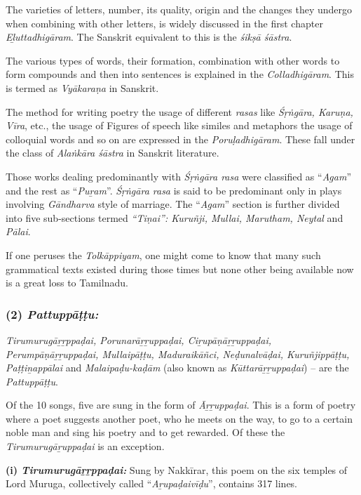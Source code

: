 The varieties of letters, number, its quality, origin and the changes they undergo when combining with other letters, is widely discussed in the first chapter \textit{Eḻuttadhigāram}. The Sanskrit equivalent to this is the \textit{śikṣā śāstra}.

The various types of words, their formation, combination with other words to form compounds and then into sentences is explained in the \textit{Colladhigāram}. This is termed as \textit{Vyākaraṇa} in Sanskrit.

The method for writing poetry the usage of different \textit{rasas} like \textit{Śṛṅgāra, Karuṇa, Vīra}, etc., the usage of Figures of speech like similes and metaphors the usage of colloquial words and so on are expressed in the \textit{Poruḷadhigāram}. These fall under the class of \textit{Alaṅkāra śāstra} in Sanskrit literature.

Those works dealing predominantly with \textit{Śṛṅgāra rasa} were classified as “\textit{Agam}” and the rest as “\textit{Puṟam}”. \textit{Śṛṅgāra rasa} is said to be predominant only in plays involving \textit{Gāndharva} style of marriage. The “\textit{Agam}” section is further divided into five sub-sections termed \textit{“Tiṇai”: Kuruñji, Mullai, Marutham, Neytal} and \textit{ Pālai}.

If one peruses the \textit{Tolkāppiyam}, one might come to know that many such grammatical texts existed during those times but none other being available now is a great loss to Tamilnadu.


\subsubsection*{(2) \textit{Pattuppāṭṭu:}}

\vskip -7pt

\textit{Tirumurugāṟṟppaḍai, Porunarāṟṟuppaḍai, Ciṟupāṇāṟṟuppaḍai, Perumpāṇā\-ṟṟuppaḍai, Mullaipāṭṭu, Maduraikāñci, Neḍunalvāḍai, Kuruñjippāṭṭu, Paṭṭi\-ṉappālai} and \textit{Malaipaḍu-kaḍām} (also known as \textit{Kūttarāṟṟuppaḍai}) – are the \textit{Pattuppāṭṭu}.

Of the 10 songs, five are sung in the form of \textit{Āṟṟuppaḍai}. This is a form of poetry where a poet suggests another poet, who he meets on the way, to go to a certain noble man and sing his poetry and to get rewarded. Of these the \textit{Tirumurugāṟuppaḍai} is an exception.

\textbf{(i) \textit{Tirumurugāṟṟppaḍai:}} Sung by Nakkīrar, this poem on the six temples of Lord Muruga, collectively called “\textit{Aṟupaḍaivīḍu}”, contains 317 lines.

